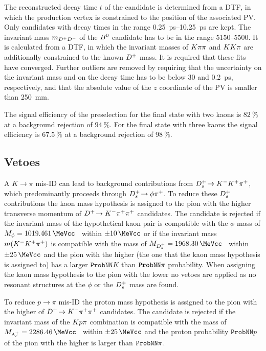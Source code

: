 The reconstructed decay time $t$ of the \Bd candidate is determined from a
DTF, in which the \Bd production vertex is constrained to the position of the
associated PV. Only candidates with decay times in the range
\SIrange{0.25}{10.25}{\ps} are kept. The invariant mass $m_{{{D}^+}{{D}^-}}$ of the
${{B}^0}$ candidate has to be in the range \SIrange{5150}{5500}{\MeVcc}. It is
calculated from a DTF, in which the invariant masses of $K\pi\pi$ and $KK\pi$
are additionally constrained to the known ${{D}^+}$ mass. It is required that
these fits have converged. Further outliers are removed by requiring that the
uncertainty on the invariant mass and on the decay time has to be below
\SI{30}{\MeVcc} and \SI{0.2}{\ps}, respectively, and that the absolute value
of the $z$ coordinate of the PV is smaller than \SI{250}{\milli\meter}.

The signal efficiency of the preselection for the final state with two kaons
is $\SI{82}{\percent}$ at a background rejection of $\SI{94}{\percent}$. For
the final state with three kaons the signal efficiency is
$\SI{67.5}{\percent}$ at a background rejection of $\SI{98}{\percent}$.

\subsection{Vetoes}
\label{sec:b02dd:selection:vetoes}

A $K\rightarrow\pi$ mis-ID can lead to background contributions from
${{D}^+_{s}}\!\rightarrow {\ensuremath{{K}^-}}{\ensuremath{{K}^+}}{\ensuremath{{\pi}^+}}$, which predominantly proceeds through ${{D}^+_{s}}\!\rightarrow \phi{\ensuremath{{\pi}^+}}$. To reduce
these ${{D}^+_{s}}$ contributions the kaon mass hypothesis is assigned to the pion
with the higher transverse momentum of ${{D}^+}\!\rightarrow {\ensuremath{{K}^-}}{\ensuremath{{\pi}^+}}{\ensuremath{{\pi}^+}}$ candidates. The candidate
is rejected if the invariant mass of the hypothetical kaon pair is compatible
with the $\phi$ mass of $M_{\phi} = \SI{1019.461}{\MeVcc}$~\cite{PDG2014}
within $\pm\SI{10}{\MeVcc}$ or if the invariant mass $m({{K}^-}{{K}^+}{{\pi}^+})$ is
compatible with the \Dsp mass of $M_{\Dsp} =
\SI{1968.30}{\MeVcc}$~\cite{PDG2014} within $\pm\SI{25}{\MeVcc}$ and the pion
with the higher \pT (the one that the kaon mass hypothesis is assigned to) has
a larger $\texttt{ProbNN}K$ than $\texttt{ProbNN}{\ensuremath{\pi}}$ probability. When
assigning the kaon mass hypothesis to the pion with the lower \pT no vetoes
are applied as no resonant structures at the $\phi$ or the ${{D}^+_{s}}$ mass are
found.

To reduce $p\rightarrow\pi$ mis-ID the proton mass hypothesis is assigned to
the pion with the higher \pT of ${{D}^+}\!\rightarrow {\ensuremath{{K}^-}}{\ensuremath{{\pi}^+}}{\ensuremath{{\pi}^+}}$ candidates. The candidate is
rejected if the invariant mass of the ${K}{p}{\pi}$ combination is
compatible with the \Lc mass of $M_{\Lc} =
\SI{2286.46}{\MeVcc}$~\cite{PDG2014} within $\pm\SI{25}{\MeVcc}$ and the
proton probability $\texttt{ProbNN}p$ of the pion with the higher \pT is
larger than $\texttt{ProbNN}{\ensuremath{\pi}}$.

